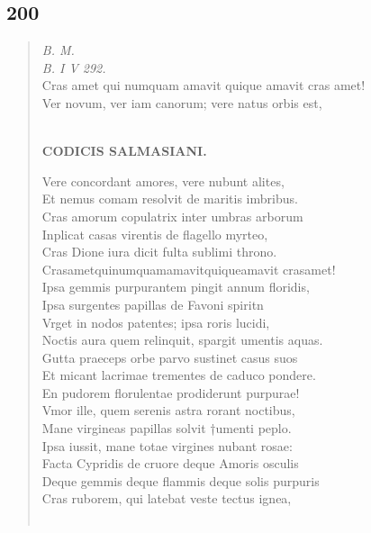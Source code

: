 \documentclass[11pt, a4paper]{report}
\begin{document}
            \subsection*{200}
      \begin{verse}
      \textit{B. M.} \\ \textit{B. I V 292.} \\ Cras amet qui numquam amavit quique amavit cras amet! \\ Ver novum, ver iam canorum; vere natus orbis est, \\ 
        ﻿\pagebreak 
    \begin{center} \textbf{CODICIS SALMASIANI.} \end{center}Vere concordant amores, vere nubunt alites, \\ Et nemus comam resolvit de maritis imbribus. \\ Cras amorum copulatrix inter umbras arborum \\ Inplicat casas virentis de flagello myrteo, \\ Cras Dione iura dicit fulta sublimi throno. \\  Crasametquinumquamamavitquiqueamavit crasamet! \\ Ipsa gemmis purpurantem pingit annum floridis, \\ Ipsa surgentes papillas de Favoni spiritn \\ Vrget in nodos patentes; ipsa roris lucidi, \\ Noctis aura quem relinquit, spargit umentis aquas. \\ Gutta praeceps orbe parvo sustinet casus suos \\ Et micant lacrimae trementes de caduco pondere. \\ En pudorem florulentae prodiderunt purpurae! \\ Vmor ille, quem serenis astra rorant noctibus, \\ Mane virgineas papillas solvit †umenti peplo. \\ Ipsa iussit, mane totae virgines nubant rosae: \\ Facta Cypridis de cruore deque Amoris osculis \\ Deque gemmis deque flammis deque solis purpuris \\ Cras ruborem, qui latebat veste tectus ignea, \\ 
        ﻿\pagebreak 

\end{verse}
\end{document}
